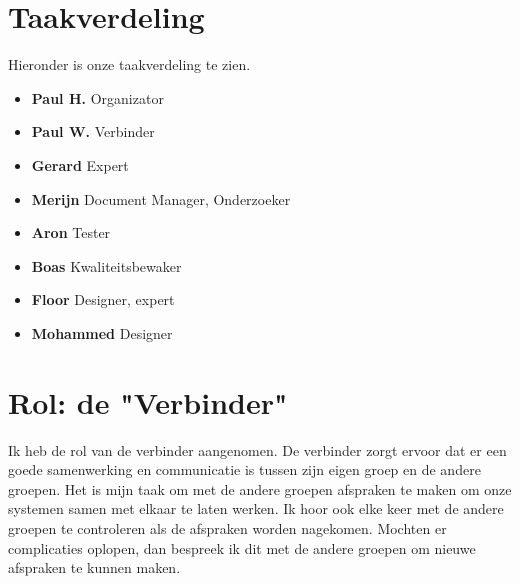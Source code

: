 \documentclass{article}
\begin{document}
\newpage

\section{Taakverdeling}

Hieronder is onze taakverdeling te zien.

\begin{itemize}
  \item \textbf{Paul H.}  Organizator
  \item \textbf{Paul W.}  Verbinder 
  \item \textbf{Gerard} Expert 
  \item \textbf{Merijn} Document Manager, Onderzoeker
  \item \textbf{Aron} Tester
  \item \textbf{Boas} Kwaliteitsbewaker 
  \item \textbf{Floor} Designer, expert
  \item \textbf{Mohammed} Designer
\end{itemize}

\vspace{10mm}
\section{Rol: de "Verbinder"}
Ik heb de rol van de verbinder aangenomen.
De verbinder zorgt ervoor dat er een goede
samenwerking en communicatie is tussen zijn
eigen groep en de andere groepen.
Het is mijn taak om met de andere groepen afspraken
te maken om onze systemen samen met elkaar
te laten werken.
Ik hoor ook elke keer met de andere groepen
te controleren als de afspraken worden nagekomen.
Mochten er complicaties oplopen,
dan bespreek ik dit met de andere groepen
om nieuwe afspraken te kunnen maken.
\end{document}

